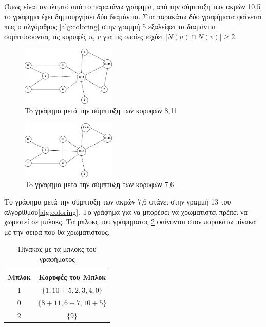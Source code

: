 Όπως είναι αντιληπτό από το παραπάνω γράφημα, από την σύμπτυξη των ακμών 10,5 το γράφημα έχει δημιουργήσει δύο διαμάντια. Στα παρακάτω δύο γραφήματα φαίνεται πως ο αλγόριθμος \ref{alg:coloring} στην γραμμή 5 εξαλείφει τα διαμάντια συμπτύσσοντας τις κορυφές $u$, $v$ για τις οποίες ισχύει $|N(u) \cap N(v)| \geq 2$.

\begin{figure}[H]
	\centering
	\includegraphics[width=0.4\textwidth]{pictures/ex-coloring-3.png} 
	\caption{To γράφημα μετά την σύμπτυξη των κορυφών 8,11}
	\label{fig:ex-coloring-3}
\end{figure}

\begin{figure}[H]
	\centering
	\includegraphics[width=0.4\textwidth]{pictures/ex-coloring-4.png} 
	\caption{To γράφημα μετά την σύμπτυξη των κορυφών 7,6}
	\label{fig:ex-coloring-4}
\end{figure}

Το γράφημα μετά την σύμπτυξη των ακμών 7,6 φτάνει στην γραμμή 13 του αλγορίθμου\ref{alg:coloring}. Το γράφημα για να μπορέσει να χρωματιστεί πρέπει να χωριστεί σε μπλοκς. Τα μπλοκς του γράφηματος \ref{fig:ex-coloring-4} φαίνονται στον παρακάτω πίνακα με την σειρά που θα χρωματιστούς. 

\begin{table}[H]
	\centering
	\begin{tabular}{|c|c|}
		\hline
		Μπλοκ & Κορυφές του Μπλοκ \\
		\hline
		1 & $\{1, 10+5, 2, 3, 4, 0 \}$ \\
		0 & $\{8+11, 6+7, 10+5 \}$ \\
		2 & $\{9 \}$ \\
		\hline
	\end{tabular}
	\caption{Πίνακας με τα μπλοκς του γραφήματος}
	\label{tab:blocks}
\end{table}

